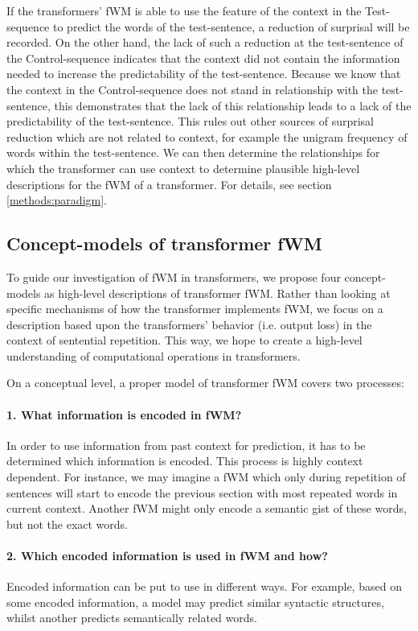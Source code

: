 If the transformers' fWM is able to use the feature of the context in the Test-sequence to predict the words of the test-sentence, a reduction of surprisal will be recorded.
On the other hand, the lack of such a reduction at the test-sentence of the Control-sequence indicates that the context did not contain the information needed to increase the predictability of the test-sentence.
Because we know that the context in the Control-sequence does not stand in relationship with the test-sentence, this demonstrates that the lack of this relationship leads to a lack of the predictability of the test-sentence.
This rules out other sources of surprisal reduction which are not related to context, for example the unigram frequency of words within the test-sentence.
We can then determine the relationships for which the transformer can use context to determine plausible high-level descriptions for the fWM of a transformer.
For details, see section \ref{methods:paradigm}.


\subsection{Concept-models of transformer fWM}

To guide our investigation of fWM in transformers, we propose four concept-models as high-level descriptions of transformer fWM.
Rather than looking at specific mechanisms of how the transformer implements fWM, we focus on a description based upon the transformers' behavior (i.e. output loss) in the context of sentential repetition.
This way, we hope to create a high-level understanding of computational operations in transformers.

On a conceptual level, a proper model of transformer fWM covers two processes:

\paragraph{1. What information is encoded in fWM?} In order to use information from past context for prediction, it has to be determined which information is encoded.
This process is highly context dependent.
For instance, we may imagine a fWM which only during repetition of sentences will start to encode the previous section with most repeated words in current context.
Another fWM might only encode a semantic gist of these words, but not the exact words.

\paragraph{2. Which encoded information is used in fWM and how?} Encoded information can be put to use in different ways.
For example, based on some encoded information, a model may predict similar syntactic structures, whilst another predicts semantically related words.

